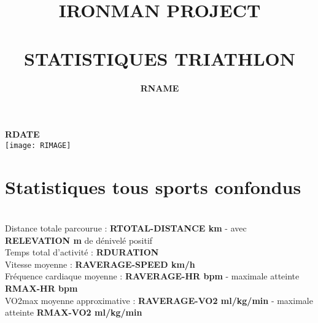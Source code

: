 \documentclass[a4paper,french,11pt]{report}
\title{	\normalsize \textsc{\uppercase{ironman project}}
		 	\\[1.2cm]
			\HRule{0.7pt} \\
			\vspace{0.5cm}
			\LARGE \textbf{\uppercase{statistiques triathlon}}	%
			\HRule{1pt} \\
			\vspace{1.7cm}
		}
\author{
		\textbf{RNAME}\\
}
\makeatletter
\def\printtitle{%
    {\centering \@title\par}}
\def\printauthor{%
    {\centering \large \@author}}
\makeatother
\begin{document}

\thispagestyle{empty}		%

\printtitle					%
\printauthor				%
\vspace{1cm}

\begin{center}

\LARGE{\textbf{RDATE}}\\
\vspace{4cm}
\texttt{[image: RIMAGE]}\\

\end{center}

\newpage


\section*{Statistiques tous sports confondus}
\thispagestyle{empty} %

\\
\textbullet Distance totale parcourue : \textbf{RTOTAL-DISTANCE km} - avec \textbf{RELEVATION m} de dénivelé positif\\
\textbullet Temps total d'activité : \textbf{RDURATION} \\
\textbullet Vitesse moyenne : \textbf{RAVERAGE-SPEED km/h} \\
\textbullet Fréquence cardiaque moyenne : \textbf{RAVERAGE-HR bpm} - maximale atteinte \textbf{RMAX-HR bpm}\\
\textbullet VO2max moyenne approximative : \textbf{RAVERAGE-VO2 ml/kg/min} - maximale atteinte \textbf{RMAX-VO2 ml/kg/min}\\
\end{document}
